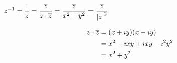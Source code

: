 



${z}^{-1}=\dfrac{1}{z}=\dfrac{\overline{z}}{z\cdot \overline{z}}=\dfrac{\overline{z}}{x^2+y^2}=\dfrac{\overline{z}}{{|z|}^2}$

\begin{align*}
z\cdot \overline{z} &= (x+\imath y)(x-\imath y) \\
&= x^2-\imath xy+\imath xy-\imath ^2y^2 \\
&= x^2+y^2
\end{align*}

